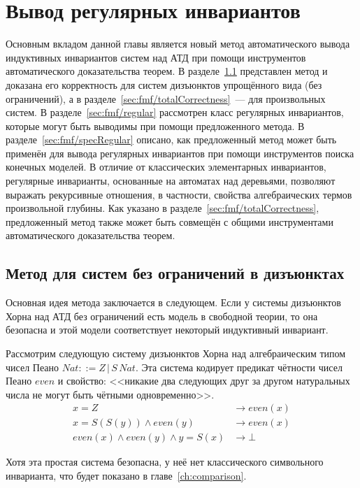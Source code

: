 \chapter{Вывод регулярных инвариантов}\label{ch:fmf}

Основным вкладом данной главы является новый метод автоматического вывода индуктивных инвариантов систем над АТД при помощи инструментов автоматического доказательства теорем.
В разделе~\cref{sec:fmf/partialCorrectness} представлен метод и доказана его корректность для систем дизъюнктов упрощённого вида (без ограничений), а в разделе~\cref{sec:fmf/totalCorrectness}~--- для произвольных систем.
В разделе~\cref{sec:fmf/regular} рассмотрен класс регулярных инвариантов, которые могут быть выводимы при помощи предложенного метода.
В разделе~\cref{sec:fmf/specRegular} описано, как предложенный метод может быть применён для вывода регулярных инвариантов при помощи инструментов поиска конечных моделей.
В отличие от классических элементарных инвариантов, регулярные инварианты, основанные на автоматах над деревьями, позволяют выражать рекурсивные отношения, в частности, свойства алгебраических термов произвольной глубины.
Как указано в разделе~\cref{sec:fmf/totalCorrectness}, предложенный метод также может быть совмещён с общими инструментами автоматического доказательства теорем.

\section{Метод для систем без ограничений в дизъюнктах}\label{sec:fmf/partialCorrectness}

Основная идея метода заключается в следующем. Если у системы дизъюнктов Хорна над АТД без ограничений есть модель в свободной теории, то она безопасна и этой модели соответствует некоторый индуктивный инвариант.

\begin{example}\label{ex:evenNat}
Рассмотрим следующую систему дизъюнктов Хорна над алгебраическим типом чисел Пеано $Nat ::= Z\,|\,S\,Nat$. Эта система кодирует предикат чётности чисел Пеано $even$ и свойство: <<никакие два следующих друг за другом натуральных числа не могут быть чётными одновременно>>.
\begin{align}
    x = Z &\rightarrow even(x)\\
    x = S(S(y)) \land even(y) &\rightarrow even(x)\\
    even(x) \land even(y) \land y = S(x) &\rightarrow \bot
\end{align}

Хотя эта простая система безопасна, у неё нет классического символьного инварианта, что будет показано в главе~\cref{ch:comparison}. 
\end{example}

